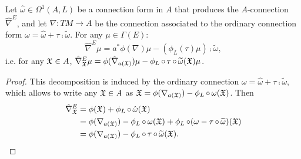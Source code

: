 \begin{proposition}\label{propositionDecompositionFormActionMatterAConnection}
Let $\hat \omega \in \Omega^1(A, L)$ be a connection form in $A$ that produces the $A$-connection $\hat \nabla^E$, and let $\nabla: TM \to A$ be the connection associated to the ordinary connection form $\omega = \hat \omega + \tau \comp \tilde \omega$. For any $\mu \in \Gamma(E)$:
\begin{equation}
    \hat \nabla^E \mu = a^* \phi(\nabla)\mu - (\phi_L(\tau) \mu)\comp \tilde \omega,
\end{equation}
i.e. for any $\mathfrak{X} \in A$, $\hat \nabla^E_{\oid X} \mu = \phi(\hat \nabla_{a(\oid X)})\mu - \phi_L \comp \tau \comp \tilde \omega(\oid X) \mu$.
\end{proposition}
\begin{proof}
This decomposition is induced by the ordinary connection $\omega = \hat \omega + \tau \comp \tilde \omega$, which allows to write any $\mathfrak{X} \in A$ as $\oid X = \phi(\nabla_{a(\oid X)}) - \phi_L \comp \omega(\oid X)$. Then 
\begin{align*}
    \hat \nabla^E_{\oid X} 
      &= \phi(\oid X) + \phi_L \comp \hat \omega(\oid X)\\
      &= \phi(\nabla_{a(\oid X)}) - \phi_L \comp \omega(\oid X) + \phi_L \comp (\omega - \tau \comp \tilde \omega)(\oid X)\\
      &= \phi(\nabla_{a(\oid X)}) - \phi_L \comp \tau \comp \tilde \omega(\oid X).
\end{align*}
\end{proof}

